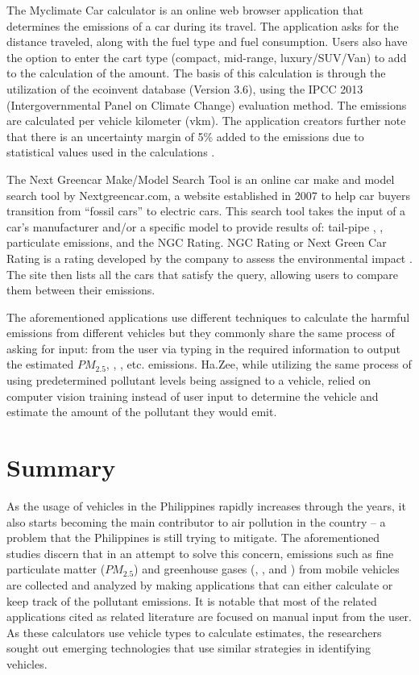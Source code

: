 	

	The Myclimate Car calculator is an online web browser application that determines the  emissions of a car during its travel. The application asks for the distance traveled, along with the fuel type and fuel consumption. Users also have the option to enter the cart type (compact, mid-range, luxury/SUV/Van) to add to the calculation of the  amount.  The basis of this calculation is through the utilization of the ecoinvent database (Version 3.6), using the IPCC 2013  (Intergovernmental Panel on Climate Change) evaluation method. The emissions are calculated per vehicle kilometer (vkm). The application creators further note that there is an uncertainty margin of 5\% added to the emissions due to statistical values used in the calculations \cite{MCF_ND}.

	The Next Greencar Make/Model Search Tool is an online car make and model search tool by Nextgreencar.com, a website established in 2007 to help car buyers transition from “fossil cars” to electric cars. This search tool takes the input of a car’s manufacturer and/or a specific model to provide results of: tail-pipe , , particulate emissions, and the NGC Rating. NGC Rating or Next Green Car Rating is a rating developed by the company to assess the environmental impact \cite{Lilly_ND}.  The site then lists all the cars that satisfy the query, allowing users to compare them between their emissions. 

	The aforementioned applications use different techniques to calculate the harmful emissions from different vehicles but they commonly share the same process of asking for input: from the user via typing in the required information to output the estimated $PM_{2.5}$, , , etc. emissions. Ha.Zee, while utilizing the same process of using predetermined pollutant levels being assigned to a vehicle, relied on computer vision training instead of user input to determine the vehicle and estimate the amount of the pollutant they would emit.

\section{Summary}
 As the usage of vehicles in the Philippines rapidly increases through the years, it also starts becoming the main contributor to air pollution in the country – a problem that the Philippines is still trying to mitigate. The aforementioned studies discern that in an attempt to solve this concern, emissions such as fine particulate matter ($PM_{2.5}$) and greenhouse gases (, , and ) from mobile vehicles are collected and analyzed by making applications that can either calculate or keep track of the pollutant emissions. It is notable that most of the related applications cited as related literature are focused on manual input from the user. As these calculators use vehicle types to calculate estimates, the researchers sought out emerging technologies that use similar strategies in identifying vehicles.
 
